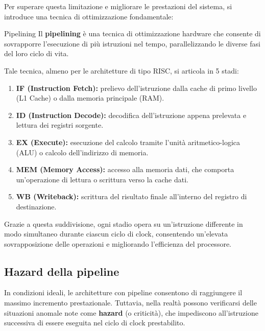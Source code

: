 \documentclass[12pt]{report}
\begin{document}
	Per superare questa limitazione e migliorare le prestazioni del sistema, si introduce una tecnica di ottimizzazione fondamentale:
	
	\begin{definizione}{Pipelining}{}
	Il \textbf{pipelining} è una tecnica di ottimizzazione hardware che consente di sovrapporre l'esecuzione di più istruzioni nel tempo, parallelizzando le diverse fasi del loro ciclo di vita.
	\end{definizione}
	
	Tale tecnica, almeno per le architetture di tipo RISC, si articola in 5 stadi:
	
	\begin{enumerate}
		\item \textbf{IF (Instruction Fetch):} prelievo dell'istruzione dalla cache di primo livello (L1 Cache) o dalla memoria principale (RAM).
		
		\item \textbf{ID (Instruction Decode):} decodifica dell'istruzione appena prelevata e lettura dei registri sorgente.
		
		\item \textbf{EX (Execute):} esecuzione del calcolo tramite l'unità aritmetico-logica (ALU) o calcolo dell'indirizzo di memoria.
		
		\item \textbf{MEM (Memory Access):} accesso alla memoria dati, che comporta un'operazione di lettura o scrittura verso la cache dati.
		
		\item \textbf{WB (Writeback):} scrittura del risultato finale all'interno del registro di destinazione.
	\end{enumerate}
	
	Grazie a questa suddivisione, ogni stadio opera su un'istruzione differente in modo simultaneo durante ciascun ciclo di clock, consentendo un'elevata sovrapposizione delle operazioni e migliorando l'efficienza del processore.
	
	\subsection{Hazard della pipeline}
	
	In condizioni ideali, le architetture con pipeline consentono di raggiungere il massimo incremento prestazionale. Tuttavia, nella realtà possono verificarsi delle situazioni anomale note come \textbf{hazard} (o criticità), che impediscono all'istruzione successiva di essere eseguita nel ciclo di clock prestabilito. 
	
\end{document}
